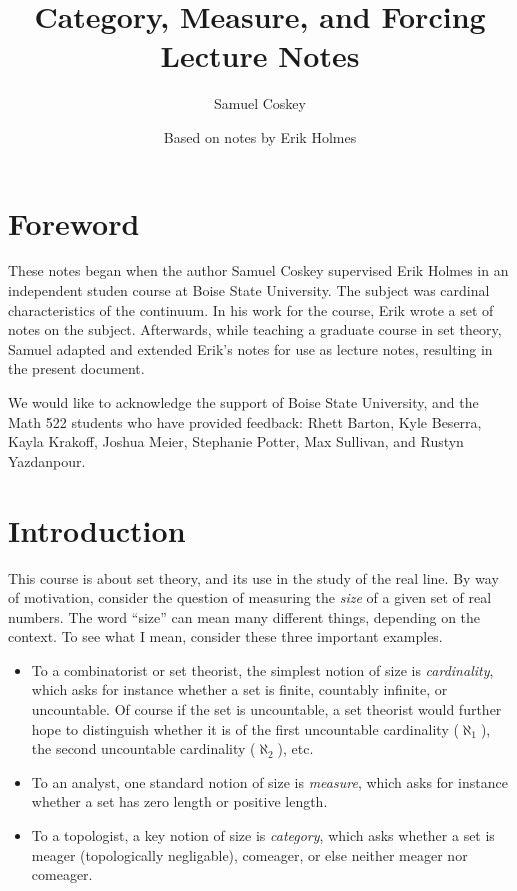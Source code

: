 \documentclass[11pt,oneside]{amsbook}
\title[Category, Measure, and Forcing]{Category, Measure, and Forcing\\\smaller Lecture Notes}
\author{Samuel Coskey}
\author{Based on notes by Erik Holmes}
\theoremstyle{definition}
\theoremstyle{plain}
\theoremstyle{definition}
\theoremstyle{remark}
\numberwithin{equation}{section}
\numberwithin{figure}{section}
\begin{document}
\frontmatter

\maketitle

\tableofcontents

\chapter*{Foreword}

These notes began when the author Samuel Coskey supervised Erik Holmes in an independent studen course at Boise State University. The subject was cardinal characteristics of the continuum. In his work for the course, Erik wrote a set of notes on the subject. Afterwards, while teaching a graduate course in set theory, Samuel adapted and extended Erik's notes for use as lecture notes, resulting in the present document.

We would like to acknowledge the support of Boise State University, and the Math 522 students who have provided feedback: Rhett Barton, Kyle Beserra, Kayla Krakoff, Joshua Meier, Stephanie Potter, Max Sullivan, and Rustyn Yazdanpour.


\mainmatter
\setcounter{page}{5}
\chapter*{Introduction}

This course is about set theory, and its use in the study of the real line. By way of motivation, consider the question of measuring the \emph{size} of a given set of real numbers. The word ``size'' can mean many different things, depending on the context. To see what I mean, consider these three important examples.

\begin{itemize}
  \item To a combinatorist or set theorist, the simplest notion of size is
\emph{cardinality}, which asks for instance whether a set is finite, countably infinite, or uncountable. Of course if the set is uncountable, a set theorist would further hope to distinguish whether it is of the first uncountable cardinality ($\aleph_1$), the second uncountable cardinality ($\aleph_2$), etc.
  \item To an analyst, one standard notion of size is \emph{measure}, which asks for instance whether a set has zero length or positive length.
  \item To a topologist, a key notion of size is \emph{category}, which asks whether a set is meager (topologically negligable), comeager, or else neither meager nor comeager.
\end{itemize}
\end{document}
